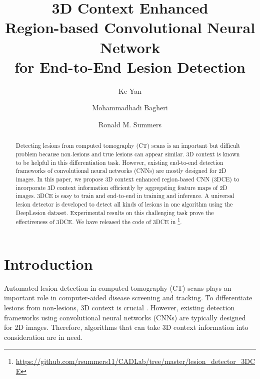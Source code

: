 \documentclass[a4paper]{llncs}
\begin{document}
\title{3D Context Enhanced \\Region-based Convolutional Neural Network \\for  End-to-End Lesion Detection}


\author{Ke Yan \and Mohammadhadi Bagheri \and Ronald M. Summers}


\maketitle
\begin{abstract}
Detecting lesions from computed tomography (CT) scans is an important but difficult problem because non-lesions and true lesions can appear similar. 3D context is known to be helpful in this differentiation task. However, existing end-to-end detection frameworks of convolutional neural networks (CNNs) are mostly designed for 2D images. In this paper, we propose 3D context enhanced region-based CNN (3DCE) to incorporate 3D context information efficiently by aggregating feature maps of 2D images. 3DCE is easy to train and end-to-end in training and inference. A universal lesion detector is developed to detect all kinds of lesions in one algorithm using the DeepLesion dataset. Experimental results on this challenging task prove the effectiveness of 3DCE. We have released the code of 3DCE in \footnote{\url{https://github.com/rsummers11/CADLab/tree/master/lesion_detector_3DCE}}.
\end{abstract}

\section{Introduction}
\label{sec:intro}

Automated lesion detection in computed tomography (CT) scans plays an important role in computer-aided disease screening and tracking. To differentiate lesions from non-lesions, 3D context is crucial \cite{ Ding2017Lung3d, Dou2017multilevel, Liao2017Lung3d, Roth2016RandomView}. However, existing detection frameworks using convolutional neural networks (CNNs) \cite{Ren2015Faster, Dai2016RFCN} are typically designed for 2D images. Therefore, algorithms that can take 3D context information into consideration are in need.
\end{document}

